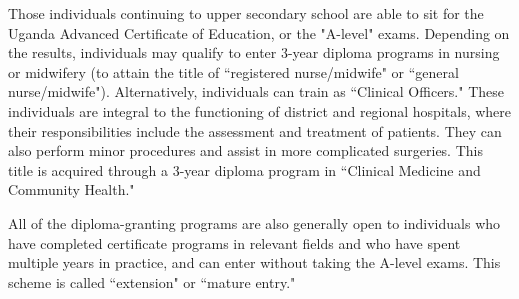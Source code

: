 \documentclass[12pt]{article} %
\begin{document}
Those individuals continuing to upper secondary school are able to sit for the Uganda Advanced Certificate of Education, or the "A-level" exams. Depending on the results, individuals may qualify to enter 3-year diploma programs in nursing or midwifery (to attain the title of ``registered nurse/midwife" or ``general nurse/midwife").
 \cite{Klopper2012-pp}
Alternatively, individuals can train as ``Clinical Officers." These individuals are integral to the functioning of district and regional hospitals, where their responsibilities include the assessment and treatment of patients. They can also perform minor procedures and assist in more complicated surgeries. This title is acquired through a 3-year diploma program in ``Clinical Medicine and Community Health." 
\cite{Banerjee2005Mar}

All of the diploma-granting programs are also generally open to individuals who have completed certificate programs in relevant fields and who have spent multiple years in practice, and can enter without taking the A-level exams. This scheme is called ``extension" or ``mature entry."
\end{document}
